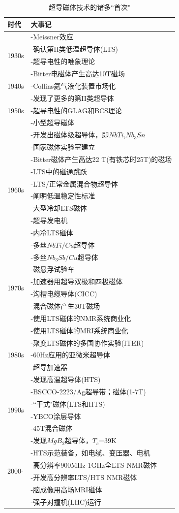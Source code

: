 \begin{table}[htbp]\small
  \centering
  \caption{超导磁体技术的诸多``首次"} \label{first event}

\begin{tabular}{ |l||l|}
\hline
时代 & 大事记  \\ \hline
\multirow{4}{*}{1930s} & -Meissner效应 \\
 & -确认第II类低温超导体(LTS)\\
 & -超导电性的唯象理论 \\
 & -Bitter电磁体产生高达10T磁场 \\
 \hline
 1940s & -Collins氦气液化装置市场化\\
 \hline
\multirow{3}{*}{1950s} & -发现了更多的第II类超导体 \\
 & -超导电性的GLAG和BCS理论\\
 & -小型超导磁体 \\
 \hline
 \multirow{10}{*}{1960s} & -开发出磁体级超导体，即$NbTi$,$Nb_3Sn$ \\
 & -国家磁体实验室建立\\
 & -Bitter磁体产生高达22 T(有铁芯时25T)的磁场\\
 & -LTS中的磁通跳跃\\
 & -LTS/正常金属混合物超导体\\
 & -阐明低温稳定性标准\\
 & -大型冷却LTS磁体\\
 & -超导发电机\\
 & -内冷LTS磁体\\
 & -多丝$NbTi/Cu$超导体\\
 \hline
 \multirow{6}{*}{1970s} & -多丝$Nb_3Sb/Cu$超导体 \\
 & -磁悬浮试验车\\
 & -加速器用超导双极和四极磁体 \\
 & -沟槽电缆导体(CICC)\\
 & -混合磁体产生30T磁场\\
 & -使用LTS磁体的NMR系统商业化\\
 \hline
  \multirow{5}{*}{1980s} & -使用LTS磁体的MRI系统商业化 \\
 & -聚变LTS磁体的多国协作实验(ITER)\\
 & -60Hz应用的亚微米超导体\\
 & -超导加速器\\
 & -发现高温超导体(HTS)\\
 \hline
   \multirow{4}{*}{1990s} & -BSCCO-2223/Ag超导带；磁体(1-7T) \\
 & -``干式"磁体(LTS和HTS)\\
 & -YBCO涂层导体\\
 & -45T混合磁体\\
 \hline
  \multirow{6}{*}{2000-} & -发现$MgB_2$超导体，$T_c$=39K \\
 & -HTS示范装备，如电缆、变压器、电机\\
 & -高分辨率900MHz-1GHz全LTS NMR磁体 \\
 & -开发高分辨率LTS/HTS NMR磁体\\
 & -脑成像用高场MRI磁体\\
 & -强子对撞机(LHC)运行\\
 \hline
\end{tabular}


\end{table}
